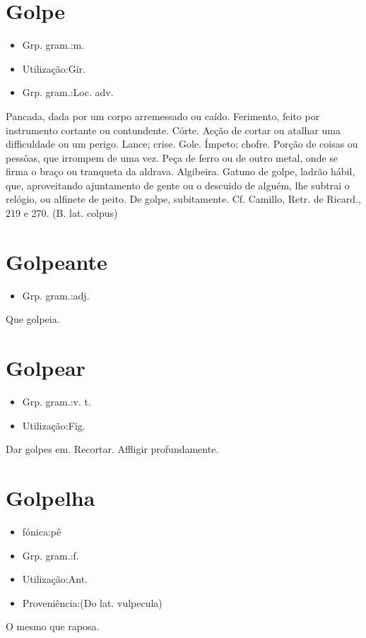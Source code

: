 \section{Golpe}
\begin{itemize}
\item {Grp. gram.:m.}
\end{itemize}
\begin{itemize}
\item {Utilização:Gír.}
\end{itemize}
\begin{itemize}
\item {Grp. gram.:Loc. adv.}
\end{itemize}
Pancada, dada por um corpo arremessado ou caído.
Ferimento, feito por instrumento cortante ou contundente.
Córte.
Acção de cortar ou atalhar uma difficuldade ou um perigo.
Lance; crise.
Gole.
Ímpeto; chofre.
Porção de coisas ou pessôas, que irrompem de uma vez.
Peça de ferro ou de outro metal, onde se firma o braço ou tranqueta da aldrava.
Algibeira.
\textunderscore Gatuno de golpe\textunderscore , ladrão hábil, que, aproveitando ajuntamento de gente ou o descuido de alguém, lhe subtrai o relógio, ou alfinete de peito.
\textunderscore De golpe\textunderscore , subitamente. Cf. Camillo, \textunderscore Retr. de Ricard.\textunderscore , 219 e 270.
(B. lat. \textunderscore colpus\textunderscore )
\section{Golpeante}
\begin{itemize}
\item {Grp. gram.:adj.}
\end{itemize}
Que golpeia.
\section{Golpear}
\begin{itemize}
\item {Grp. gram.:v. t.}
\end{itemize}
\begin{itemize}
\item {Utilização:Fig.}
\end{itemize}
Dar golpes em.
Recortar.
Affligir profundamente.
\section{Golpelha}
\begin{itemize}
\item {fónica:pê}
\end{itemize}
\begin{itemize}
\item {Grp. gram.:f.}
\end{itemize}
\begin{itemize}
\item {Utilização:Ant.}
\end{itemize}
\begin{itemize}
\item {Proveniência:(Do lat. \textunderscore vulpecula\textunderscore )}
\end{itemize}
O mesmo que \textunderscore raposa\textunderscore .
